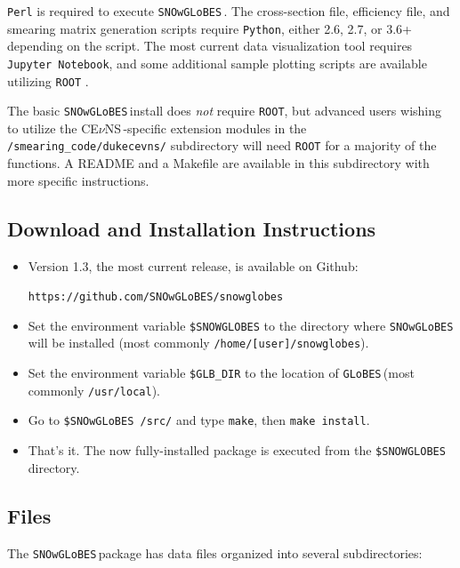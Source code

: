 \documentclass{article}
\newcommand{\cev}{CE$\nu$NS\,}
\newcommand{\snow}{\texttt{SNOwGLoBES}\,}
\newcommand{\glb}{\texttt{GLoBES}\,}
\begin{document}
\texttt{Perl} is required to execute \snow. The cross-section file, efficiency file, and smearing matrix generation scripts require \texttt{Python}, either 2.6, 2.7, or 3.6+ depending on the script. The most current data visualization tool requires \texttt{Jupyter Notebook}, and some additional sample plotting scripts are available utilizing \texttt{ROOT} \cite{root}. 

The basic \snow install does \textit{not} require \texttt{ROOT}, but advanced users wishing to utilize the \cev-specific extension modules in the \texttt{/smearing\_code/dukecevns/} subdirectory will need \texttt{ROOT} for a majority of the functions. A README and a Makefile are available in this subdirectory with more specific instructions.

\subsection{Download and Installation Instructions}
\begin{itemize}
    \item Version 1.3, the most current release, is available on Github:

\texttt{https://github.com/SNOwGLoBES/snowglobes}

    \item Set the environment variable \texttt{\$SNOWGLOBES} to the directory where \snow will be installed (most commonly \texttt{/home/[user]/snowglobes}).
    \item Set the environment variable \texttt{\$GLB\_DIR} to the location of \glb (most commonly \texttt{/usr/local}).
    \item Go to \texttt{\$\snow/src/} and type \texttt{make}, then \texttt{make install}.
    \item That's it. The now fully-installed package is executed from the \texttt{\$SNOWGLOBES} directory.
\end{itemize}

\subsection{Files}
The \snow package has data files organized into several subdirectories:
\end{document}
